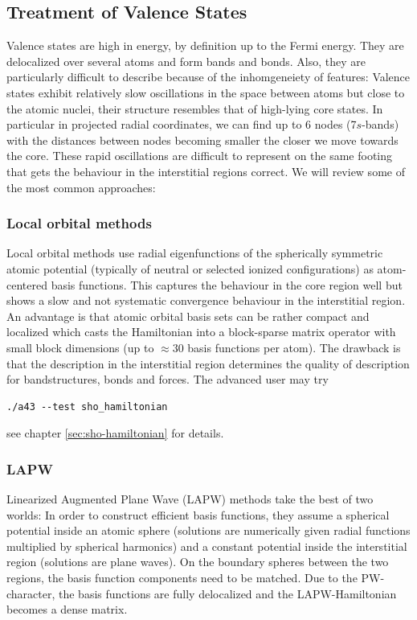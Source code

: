 \documentclass[oribibl]{llncs}
\begin{document}
\subsection{Treatment of Valence States} \label{sec:valence-states}
%
Valence states are high in energy, by definition up to the Fermi energy.
They are delocalized over several atoms and form bands and bonds.
Also, they are particularly difficult to describe because of the 
inhomgeneiety of features:
Valence states exhibit relatively slow oscillations 
in the space between atoms but close to the atomic nuclei,
their structure resembles that of high-lying core states.
In particular in projected radial coordinates, we can find up to $6$ nodes
(7$s$-bands) with the distances between nodes becoming smaller
the closer we move towards the core.
These rapid oscillations are difficult to represent
on the same footing that gets the behaviour in the interstitial regions correct. 
We will review some of the most common approaches:

\subsubsection*{Local orbital methods}
Local orbital methods use radial eigenfunctions 
of the spherically symmetric atomic potential (typically of neutral or selected ionized configurations) as atom-centered basis functions.
This captures the behaviour in the core region well
but shows a slow and not systematic convergence behaviour in the interstitial region. 
An advantage is that atomic orbital basis sets can be rather compact
and localized which casts the Hamiltonian into a block-sparse matrix operator with small block dimensions (up to $\approx 30$ basis functions per atom).
The drawback is that the description in the interstitial region determines the
quality of description for bandstructures, bonds and forces.
The advanced user may try
\begin{verbatim}
./a43 --test sho_hamiltonian
\end{verbatim}
see chapter \ref{sec:sho-hamiltonian} for details.

\subsubsection*{LAPW}
Linearized Augmented Plane Wave (LAPW) methods take the best of two worlds:
In order to construct efficient basis functions, 
they assume a spherical potential inside an atomic sphere (solutions are numerically given radial functions multiplied by spherical harmonics)
and a constant potential inside the interstitial region (solutions are plane waves). 
On the boundary spheres between the two regions, the basis function components need to be matched.
Due to the \ac{PW}-character, the basis functions are fully delocalized and 
the LAPW-Hamiltonian becomes a dense matrix.
\end{document}

